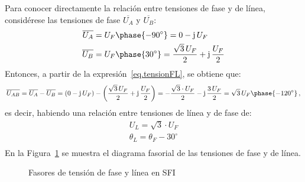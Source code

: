 \documentclass[11pt]{book} %
\numberwithin{dummy}{section}
\theoremstyle{ocrenumbox}
\theoremstyle{blacknumex}
\theoremstyle{blacknumbox}
\theoremstyle{ocrenum}
\begin{document}
	Para conocer directamente la relación entre tensiones de fase y de línea, considérese las tensiones de fase $\overline{U_A}$ y $\overline{U_B}$: 
	\begin{align*}
		\overline{U_A} &= U_F\phase{-90^\circ}=0-\mathrm{j}\,U_F
		\\
		\overline{U_B} &= U_F\phase{30^\circ}=\dfrac{\sqrt{3}\,U_F}{2}+\mathrm{j}\,\dfrac{U_F}{2}
	\end{align*}
	Entonces, a partir de la expresión~\eqref{eq.tensionFL}, se obtiene que: 
	\begin{equation*}
		\overline{U_{AB}}=\overline{U_{A}}-\overline{U_{B}}=(0-\mathrm{j}\,U_F)-\left(\dfrac{\sqrt{3}\,U_F}{2}+\mathrm{j}\,\dfrac{U_F}{2}\right)=-\dfrac{\sqrt{3}\cdot U_F}{2}-\mathrm{j}\,\dfrac{3\,U_F}{2}=\sqrt{3}\,U_F \phase{-120^\circ}\,,
	\end{equation*}
	es decir, habiendo una relación entre tensiones de línea y de fase de: 
	\begin{equation}
		\boxed{
			\begin{array}{l}
				U_L = \sqrt{3}\cdot U_F\\
				\theta_L = \theta_F - 30^\circ\\
			\end{array}
		} 
	\end{equation}
	En la Figura~\ref{fig.linea-fase-SFI} se muestra el diagrama fasorial de las tensiones de fase y de línea. 

	\begin{figure}[htbp]
		\centering
		\hfil
		\caption{Fasores de tensión de fase y línea en SFI}
		\label{fig.linea-fase-SFI}
	\end{figure}
	
\end{document}
